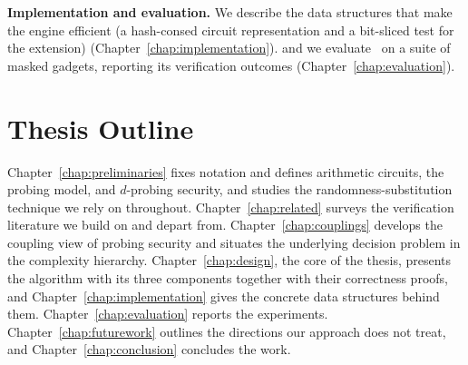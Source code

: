 \textbf{Implementation and evaluation.} We describe the data structures that make
the engine efficient (a hash-consed circuit representation and a bit-sliced test for the extension)
(Chapter~\ref{chap:implementation}). and we evaluate
\toolname\ on a suite of masked gadgets, reporting its verification outcomes
(Chapter~\ref{chap:evaluation}).

\section{Thesis Outline}
\label{sec:intro-outline}

Chapter~\ref{chap:preliminaries} fixes notation and defines arithmetic circuits, the
probing model, and $d$-probing security, and studies the randomness-substitution
technique we rely on throughout. Chapter~\ref{chap:related} surveys the verification
literature we build on and depart from. Chapter~\ref{chap:couplings} develops the
coupling view of probing security and situates the underlying decision problem in
the complexity hierarchy. Chapter~\ref{chap:design}, the core of the thesis,
presents the algorithm with its three components together with their correctness
proofs, and Chapter~\ref{chap:implementation} gives the concrete data structures
behind them. Chapter~\ref{chap:evaluation} reports the experiments.
Chapter~\ref{chap:futurework} outlines the directions our approach does not treat,
and Chapter~\ref{chap:conclusion} concludes the work.
